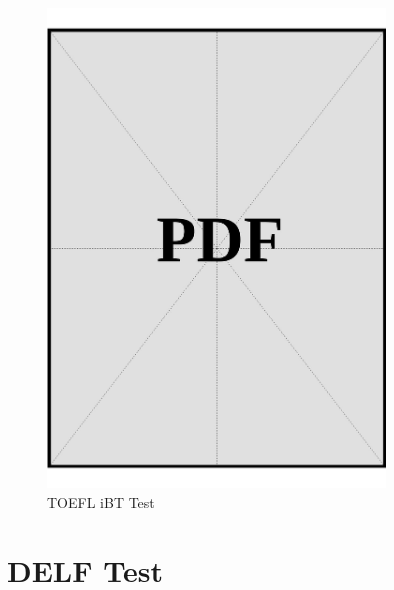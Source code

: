 \begin{figure}[ht]
  \centering
  \includegraphics[page=1, width=0.8\textwidth]{../docs/applicant/language-proficiency/english/toefl.pdf}
  \caption{TOEFL iBT Test}
  \label{pdf:toefl-page1}
\end{figure}

\clearpage

\section{DELF Test}\label{sec:delf}

